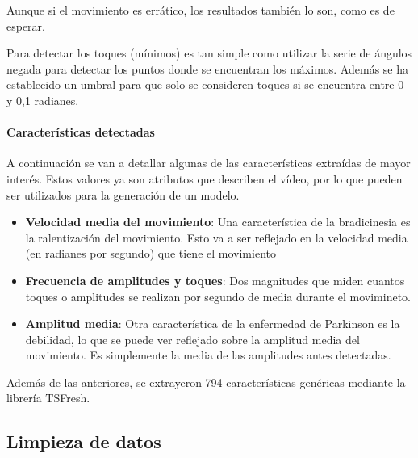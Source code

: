 
Aunque si el movimiento es errático, los resultados también lo son, como es de
esperar.


Para detectar los toques (mínimos) es tan simple como utilizar la serie de
ángulos negada para detectar los puntos donde se encuentran los máximos. Además
se ha establecido un umbral para que solo se consideren toques si se encuentra
entre 0 y 0,1 radianes.


\paragraph{Características detectadas}

A continuación se van a detallar algunas de las características extraídas de
mayor interés. Estos valores ya son atributos que describen el vídeo, por lo que
pueden ser utilizados para la generación de un modelo.

\begin{itemize}
    \item \textbf{Velocidad media del movimiento}: Una característica de la
    bradicinesia es la ralentización del movimiento. Esto va a ser reflejado en
    la velocidad media (en radianes por segundo) que tiene el movimiento
    \item \textbf{Frecuencia de amplitudes y toques}: Dos magnitudes que miden
    cuantos toques o amplitudes se realizan por segundo de media durante el
    movimineto.
    \item \textbf{Amplitud media}: Otra característica de la enfermedad de
    Parkinson es la debilidad, lo que se puede ver reflejado sobre la amplitud
    media del movimiento. Es simplemente la media de las amplitudes antes
    detectadas.
\end{itemize}

Además de las anteriores, se extrayeron 794 características genéricas
mediante la librería TSFresh.

\subsection{Limpieza de datos}

